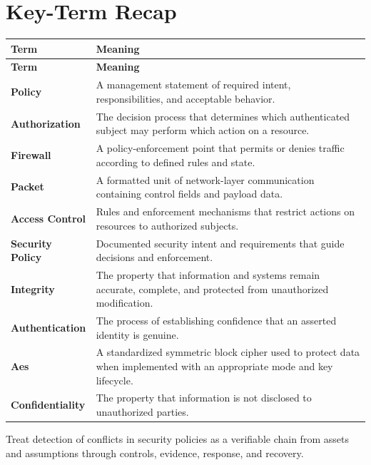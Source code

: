 \documentclass[11pt]{article}
\begin{document}
\section*{Key-Term Recap}
\begin{longtable}{>{\RaggedRight\arraybackslash}p{}>{\RaggedRight\arraybackslash}p{}}
\toprule\rowcolor{Navy}\color{white}\textbf{Term} & \color{white}\textbf{Meaning}\\\midrule
\endfirsthead
\toprule\rowcolor{Navy}\color{white}\textbf{Term} & \color{white}\textbf{Meaning}\\\midrule
\endhead
\textbf{Policy} & A management statement of required intent, responsibilities, and acceptable behavior. \\\midrule
\textbf{Authorization} & The decision process that determines which authenticated subject may perform which action on a resource. \\\midrule
\textbf{Firewall} & A policy-enforcement point that permits or denies traffic according to defined rules and state. \\\midrule
\textbf{Packet} & A formatted unit of network-layer communication containing control fields and payload data. \\\midrule
\textbf{Access Control} & Rules and enforcement mechanisms that restrict actions on resources to authorized subjects. \\\midrule
\textbf{Security Policy} & Documented security intent and requirements that guide decisions and enforcement. \\\midrule
\textbf{Integrity} & The property that information and systems remain accurate, complete, and protected from unauthorized modification. \\\midrule
\textbf{Authentication} & The process of establishing confidence that an asserted identity is genuine. \\\midrule
\textbf{Aes} & A standardized symmetric block cipher used to protect data when implemented with an appropriate mode and key lifecycle. \\\midrule
\textbf{Confidentiality} & The property that information is not disclosed to unauthorized parties. \\\midrule
\bottomrule
\end{longtable}
\begin{takeawaybox}
Treat detection of conflicts in security policies as a verifiable chain from assets and assumptions through controls, evidence, response, and recovery.
\end{takeawaybox}
\end{document}
